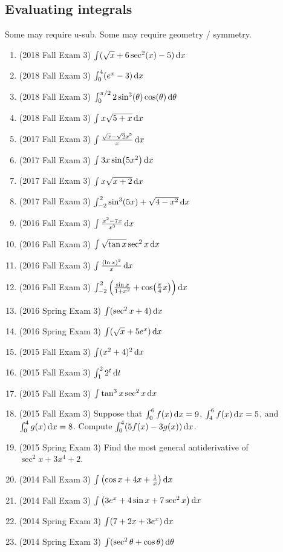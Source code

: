 \documentclass[10pt]{scrartcl}
\begin{document}
\subsection{Evaluating integrals}
Some may require u-sub. Some may require geometry / symmetry.
\begin{enumerate}
\item (2018 Fall Exam 3) $\int (\sqrt x + 6\sec^2(x) - 5) \dif x$
\item (2018 Fall Exam 3) $\int_0^4 (e^x - 3) \dif x$
\item (2018 Fall Exam 3) $\int_0^{\pi/2} 2\sin^3(\theta) \cos(\theta) \dif \theta$
\item (2018 Fall Exam 3) $\int x \sqrt{5+x} \dif x$
\item (2017 Fall Exam 3) $\int \frac{\sqrt x - \sqrt 2 x^5}{x} \dif x$
\item (2017 Fall Exam 3) $\int 3x \sin(5x^2) \dif x$
\item (2017 Fall Exam 3) $\int x \sqrt{x+2} \dif x$
\item (2017 Fall Exam 3) $\int_{-2}^2 \sin^3(5x) + \sqrt{4-x^2} \dif x$
\item (2016 Fall Exam 3) $\int \frac{x^2 - 7x}{x^3} \dif x$
\item (2016 Fall Exam 3) $\int \sqrt{\tan x}\sec^2 x \dif x$
\item (2016 Fall Exam 3) $\int \frac{(\ln x)^3}{x} \dif x$
\item (2016 Fall Exam 3) $\int_{-2}^2 \left( \frac{\sin x}{1+x^2} + \cos(\frac{\pi}4 x) \right) \dif x$
\item (2016 Spring Exam 3) $\int (\sec^2 x + 4) \dif x$
\item (2016 Spring Exam 3) $\int (\sqrt x + 5e^x) \dif x$
\item (2015 Fall Exam 3) $\int (x^2 + 4)^2 \dif x$
\item (2015 Fall Exam 3) $\int_1^2 2^t \dif t$
\item (2015 Fall Exam 3) $\int \tan^3 x \sec^2 x \dif x$
\item (2015 Fall Exam 3) Suppose that $\int_0^6 f(x) \dif x = 9$, $\int_4^6 f(x) \dif x = 5$, and $\int_0^4 g(x) \dif x = 8$. Compute $\int_0^4 (5f(x) - 3g(x)) \dif x$.   
\item (2015 Spring Exam 3) Find the most general antiderivative of $\sec^2 x + 3x^4 + 2$. 
\item (2014 Fall Exam 3) $\int \left( \cos x + 4x + \frac{1}{x} \right) \dif x$
\item (2014 Fall Exam 3) $\int \left( 3e^x + 4\sin x + 7\sec^2 x \right) \dif x$
\item (2014 Spring Exam 3) $\int (7 + 2x + 3e^x) \dif x$
\item (2014 Spring Exam 3) $\int (\sec^2 \theta + \cos \theta) \dif \theta$
\end{enumerate}
\end{document}
